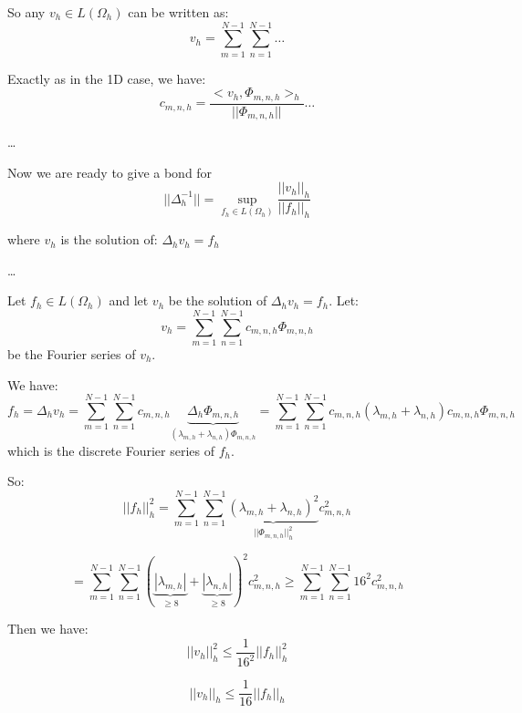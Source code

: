 So any $v_h \in L(\Omega_h)$ can be written as:
\begin{equation*}
v_h = \sum_{m=1}^{N-1} \sum_{n=1}^{N-1} \dots
\end{equation*}

Exactly as in the 1D case, we have:
\begin{equation*}
c_{m,n,h} = \frac{<v_h, \Phi_{m,n,h}>_h}{||\Phi_{m,n,h}||} \dots
\end{equation*}

\dots

Now we are ready to give a bond for 
\begin{equation*}
||\Delta_h^{-1}|| = \sup_{f_h \in L(\Omega_h)} \frac{||v_h||_h}{||f_h||_h}
\end{equation*}

where $v_h$ is the solution of: $\Delta_h v_h = f_h$

\dots

Let $f_h \in L(\Omega_h)$ and let $v_h$ be the solution of $\Delta_h v_h = f_h$. Let:
\begin{equation*}
v_h = \sum_{m=1}^{N-1} \sum_{n=1}^{N-1} c_{m,n,h} \Phi_{m,n,h}
\end{equation*}
be the Fourier series of $v_h$.

We have:
\begin{equation*}
f_h = \Delta_h v_h = \sum_{m=1}^{N-1} \sum_{n=1}^{N-1} c_{m,n,h} \underbrace{\Delta_h \Phi_{m,n,h}}_{(\lambda_{m,h} + \lambda_{n,h})\Phi_{m,n,h}} = \sum_{m=1}^{N-1} \sum_{n=1}^{N-1} c_{m,n,h} (\lambda_{m,h} + \lambda_{n,h}) c_{m,n,h} \Phi_{m,n,h}
\end{equation*}
which is the discrete Fourier series of $f_h$.

So:
\begin{equation*}
||f_h||_h^2 = \sum_{m=1}^{N-1} \sum_{n=1}^{N-1} \underbrace{(\lambda_{m,h} + \lambda_{n,h})^2}_{||\Phi_{m,n,h}||_h^2} c_{m,n,h}^2
\end{equation*}

\begin{equation*}
= \sum_{m=1}^{N-1} \sum_{n=1}^{N-1} (\underbrace{|\lambda_{m,h}|}_{\ge 8} + \underbrace{|\lambda_{n,h}|}_{\ge 8})^2 c_{m,n,h}^2 \ge \sum_{m=1}^{N-1} \sum_{n=1}^{N-1} 16^2 c_{m,n,h}^2
\end{equation*}

Then we have:
\begin{equation*}
||v_h||_h^2 \le \frac{1}{16^2} ||f_h||_h^2
\end{equation*}

\begin{equation*}
||v_h||_h \le \frac{1}{16} ||f_h||_h
\end{equation*}

